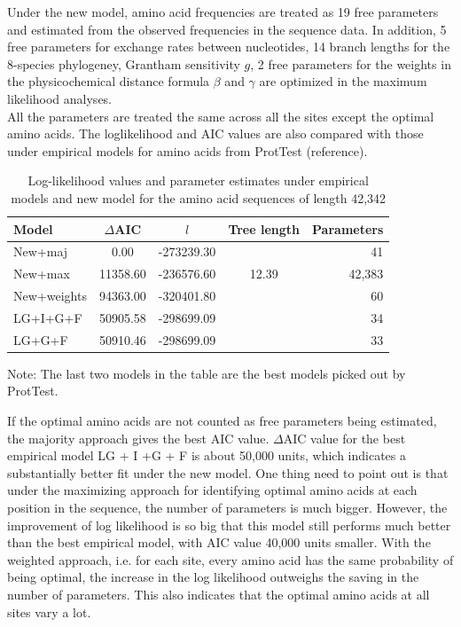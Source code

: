 \documentclass[13pt]{article}
\begin{document}
Under the new model, amino acid frequencies are treated as 19 free parameters and estimated from the observed frequencies in the sequence data. In addition, 5 free parameters for exchange rates between nucleotides, 14 branch lengths for the 8-species phylogeney, Grantham sensitivity $g$, 2 free parameters for the weights in the physicochemical distance formula $\beta$ and $\gamma$ are optimized in the maximum likelihood analyses.\\


All the parameters are treated the same across all the sites except the optimal amino acids. The loglikelihood and AIC values are also compared with those under empirical models for amino acids from ProtTest (reference). \\

\begin{table}[h]
\begin{center}
\caption{Log-likelihood values and parameter estimates under empirical models and new model for the amino acid sequences of length 42,342}
\begin{tabular}{l c c c r}
\hline
Model & $\Delta$AIC & $l$ & Tree length & Parameters \\
\hline
New+maj & 0.00 & -273239.30 & & 41 \\
New+max & 11358.60 & -236576.60 & 12.39 & 42,383 \\
New+weights & 94363.00 & -320401.80 & & 60 \\
LG+I+G+F & 50905.58 & -298699.09 &  & 34\\
LG+G+F & 50910.46 & -298699.09 & & 33 \\
\hline
\end{tabular}
\end{center}

Note: The last two models in the table are the best models picked out by ProtTest.
\label{table:mle}
\end{table}

If the optimal amino acids are not counted as free parameters being estimated, the majority approach gives the best AIC value. $\Delta$AIC value for the best empirical model LG + I +G + F is about 50,000 units, which indicates a substantially better fit under the new model. One thing need to point out is that under the maximizing approach for identifying optimal amino acids at each position in the sequence, the number of parameters is much bigger. However, the improvement of log likelihood is so big that this model still performs much better than the best empirical model, with AIC value 40,000 units smaller. With the weighted approach, i.e. for each site, every amino acid has the same probability of being optimal, the increase in the log likelihood outweighs the saving in the number of parameters. This also indicates that the optimal amino acids at all sites vary a lot.  
\end{document}
